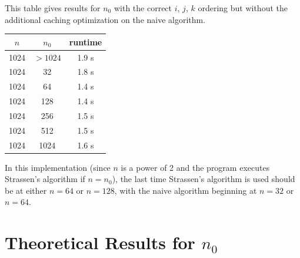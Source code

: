 \documentclass{article}
\begin{document}
This table gives results for $n_0$ with the correct $i$, $j$, $k$ ordering but without the additional caching optimization on the naive algorithm.
\begin{center}
\begin{tabular} { |c|c|c| }
\hline
$n$ & $n_0$ & runtime \\
\hline\hline
1024 & $>1024$ &  1.9 s\\
\hline\hline
1024 & 32 & 1.8 s \\
\hline
1024 & 64  & 1.4 s \\
\hline
1024 & 128 & 1.4 s\\
\hline
1024 & 256 & 1.5 s\\
\hline
1024 & 512 & 1.5 s \\ 
\hline
1024 & 1024 & 1.6 s\\
\hline
\end{tabular}
\end{center}
In this implementation (since $n$ is a power of 2 and the program executes Strassen's algorithm if $n = n_0$), the last time Strassen's algorithm is used should be at either $n=64$ or $n=128$, with the naive algorithm beginning at $n=32$ or $n=64$.

\section*{Theoretical Results for $n_0$} 
\end{document}
